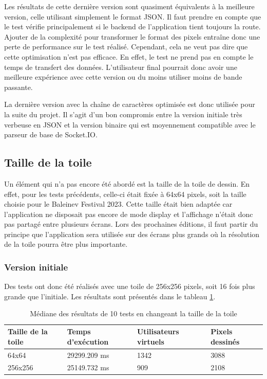 Les résultats de cette dernière version sont quasiment équivalents à la meilleure version, celle utilisant simplement le format JSON. Il faut prendre en compte que le test vérifie principalement si le backend de l'application tient toujours la route. Ajouter de la complexité pour transformer le format des pixels entraîne donc une perte de performance sur le test réalisé. Cependant, cela ne veut pas dire que cette optimisation n'est pas efficace. En effet, le test ne prend pas en compte le temps de transfert des données. L'utilisateur final pourrait donc avoir une meilleure expérience avec cette version ou du moins utiliser moins de bande passante.

La dernière version avec la chaîne de caractères optimisée est donc utilisée pour la suite du projet. Il s'agit d'un bon compromis entre la version initiale très verbeuse en JSON et la version binaire qui est moyennement compatible avec le parseur de base de Socket.IO.

\subsection{Taille de la toile}

Un élément qui n'a pas encore été abordé est la taille de la toile de dessin. En effet, pour les tests précédents, celle-ci était fixée à 64x64 pixels, soit la taille choisie pour le Baleinev Festival 2023. Cette taille était bien adaptée car l'application ne disposait pas encore de mode display et l'affichage n'était donc pas partagé entre plusieurs écrans. Lors des prochaines éditions, il faut partir du principe que l'application sera utilisée sur des écrans plus grands où la résolution de la toile pourra être plus importante.

\subsubsection{Version initiale}

Des tests ont donc été réalisés avec une toile de 256x256 pixels, soit 16 fois plus grande que l'initiale. Les résultats sont présentés dans le tableau \ref{table:canvas-size-results}.

\begin{table}[H]
  \centering
  \begin{tabular}{|l|l|l|l|}
    \hline
    \textbf{Taille de la toile} & \textbf{Temps d'exécution} & \textbf{Utilisateurs virtuels} & \textbf{Pixels dessinés} \\ \hline
    64x64                       & 29299.209 ms               & 1342                           & 3088                     \\ \hline
    256x256                     & 25149.732 ms               & 909                            & 2108                     \\ \hline
  \end{tabular}
  \caption{Médiane des résultats de 10 tests en changeant la taille de la toile}
  \label{table:canvas-size-results}
\end{table}

